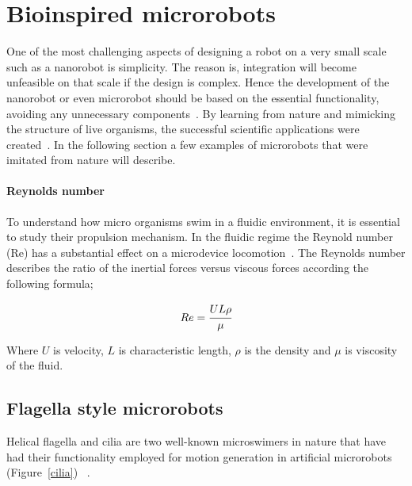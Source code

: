 \documentclass[12pt,a4paper,titlepage]{report}
\begin{document}
\section{Bioinspired microrobots}

One of the most challenging aspects of designing a robot on a very small scale such 
as a nanorobot is simplicity. The reason is, integration will become unfeasible on that
 scale if the design is complex. Hence the development of the nanorobot or even microrobot
 should be based on the essential functionality, avoiding any unnecessary components~\citep{gao2013bioinspired}.
By learning from nature and mimicking the structure of live organisms, the successful  
scientific applications were created~\citep{qiunanohelices}. In the following section a
 few examples of microrobots that were imitated from nature will describe. 
 



\paragraph{Reynolds number}

To understand how micro organisms swim in a fluidic environment, it is essential to study their propulsion 
mechanism. In the fluidic regime the Reynold number (Re) has a substantial effect on a microdevice
locomotion~\citep{peyer2013magnetic}. The Reynolds number describes the ratio of the inertial forces versus viscous 
forces according the following formula;

\begin{equation}
  Re = \cfrac{UL\rho}{\mu}
\label{eq:4}
\end{equation}
 
Where $ U$ is velocity, $L$ is characteristic length, $\rho$ is the density and $\mu$ is viscosity of the fluid.






\subsection{Flagella style microrobots}

Helical flagella and cilia are two well-known microswimers in nature that have had their functionality employed 
for motion generation in artificial microrobots  (Figure~\ref{cilia}) ~\citep{gao2013bioinspired}. 
\end{document}

